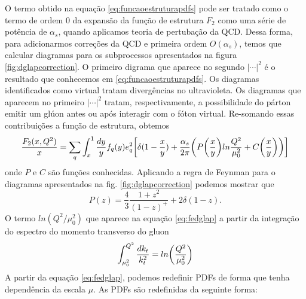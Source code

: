 O termo obtido na equação \eqref{eq:funcaoestruturapdfs} pode ser tratado como o termo de ordem $0$ da expansão da função de estrutura  $F_2$ como uma série de potência de $\alpha_s$, quando aplicamos teoria de pertubação da QCD. Dessa forma, para adicionarmos correções da QCD e primeira ordem $O(\alpha_s)$, temos que calcular diagramas para os subprocessos apresentados na figura \eqref{fig:dglapcorrection}. O primeiro digrama que aparece no segundo $|\cdots|^2$ é o resultado que conhecemos em \eqref{eq:funcaoestruturapdfs}. Os diagramas identificados como virtual  tratam divergências no ultravioleta. Os diagramas que aparecem no primeiro $|\cdots|^2$ tratam, respectivamente, a possibilidade do párton emitir um glúon antes ou após interagir com o fóton virtual. Re-somando essas contribuições  a função de estrutura, obtemos
\begin{equation}
    \frac{F_2(x,Q^2)}{x} = \sum_q  \int^1_x \frac{dy}{y} f_q(y) e_q^2  \qty[\delta(1-\frac{x}{y}) + \frac{\alpha_s}{2\pi}\qty(P\qty(\frac{x}{y})ln\frac{Q^2}{\mu_0^2} + C\qty(\frac{x}{y}))]
    \label{eq:fedglap}
\end{equation}
onde $P$ e $C$ são funções conhecidas. Aplicando a regra de Feynman para o diagramas apresentados na fig. \eqref{fig:dglapcorrection}  podemos mostrar que
\begin{equation}
    P(z) = \frac{4}{3} \frac{1+z^2}{(1-z)^+} + 2\delta(1-z).
\end{equation}
O termo $ln(Q^2/\mu_0^2)$ que aparece na equação \eqref{eq:fedglap} a partir da integração do espectro do momento transverso do gluon
\begin{equation}
    \int^{Q^2}_{\mu_0^2} \frac{dk_t}{k_t^2} = ln\qty(\frac{Q^2}{\mu_0^2})
\end{equation}
A partir da equação \eqref{eq:fedglap}, podemos redefinir PDFs de forma que tenha dependência da escala $\mu$. As PDFs são redefinidas da seguinte forma:


